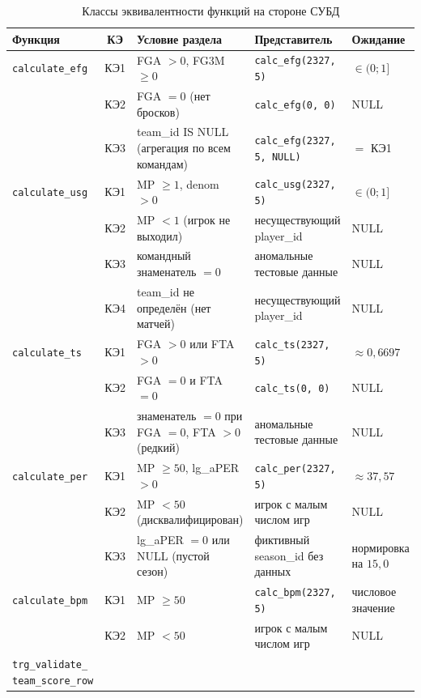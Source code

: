 \begin{table}[H]
\caption{Классы эквивалентности функций на стороне СУБД}
\label{tab:eq-classes}
\centering
\begin{tabular}{|>{\raggedright\arraybackslash}p{}|c|>{\raggedright\arraybackslash}p{}|>{\raggedright\arraybackslash}p{}|>{\raggedright\arraybackslash}p{}|}
\hline
\textbf{Функция} & \textbf{КЭ} & \textbf{Условие раздела} & \textbf{Представитель} & \textbf{Ожидание} \\
\hline

\texttt{calculate\_efg}
 & КЭ1 & FGA $> 0$, FG3M $\geq 0$ & \texttt{calc\_efg(2327, 5)} & $\in (0; 1]$ \\
 & КЭ2 & FGA $= 0$ (нет бросков) & \texttt{calc\_efg(0, 0)} & NULL \\
 & КЭ3 & team\_id IS NULL (агрегация по всем командам) & \texttt{calc\_efg(2327, 5, NULL)} & $=$ КЭ1 \\
\hline
\texttt{calculate\_usg}
 & КЭ1 & MP $\geq 1$, denom $> 0$ & \texttt{calc\_usg(2327, 5)} & $\in (0; 1]$ \\
 & КЭ2 & MP $< 1$ (игрок не выходил) & несуществующий player\_id & NULL \\
 & КЭ3 & командный знаменатель $= 0$ & аномальные тестовые данные & NULL \\
 & КЭ4 & team\_id не определён (нет матчей) & несуществующий player\_id & NULL \\
\hline
\texttt{calculate\_ts}
 & КЭ1 & FGA $> 0$ или FTA $> 0$ & \texttt{calc\_ts(2327, 5)} & $\approx 0{,}6697$ \\
 & КЭ2 & FGA $= 0$ и FTA $= 0$ & \texttt{calc\_ts(0, 0)} & NULL \\
 & КЭ3 & знаменатель $= 0$ при FGA $= 0$, FTA $> 0$ (редкий) & аномальные тестовые данные & NULL \\
\hline
\texttt{calculate\_per}
 & КЭ1 & MP $\geq 50$, lg\_aPER $> 0$ & \texttt{calc\_per(2327, 5)} & $\approx 37{,}57$ \\
 & КЭ2 & MP $< 50$ (дисквалифицирован) & игрок с малым числом игр & NULL \\
 & КЭ3 & lg\_aPER $= 0$ или NULL (пустой сезон) & фиктивный season\_id без данных & нормировка на $15{,}0$ \\
\hline
\texttt{calculate\_bpm}
 & КЭ1 & MP $\geq 50$ & \texttt{calc\_bpm(2327, 5)} & числовое значение \\
 & КЭ2 & MP $< 50$ & игрок с малым числом игр & NULL \\
\hline
\texttt{trg\_validate\_} \texttt{team\_score\_row}

\end{tabular}
\end{table}
